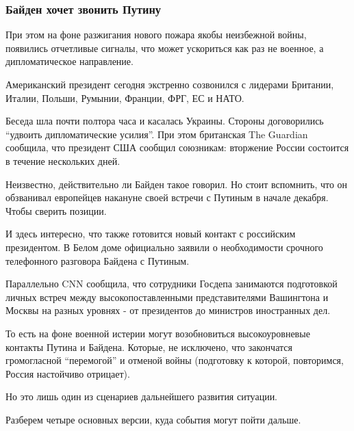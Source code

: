  
 
 
 
 

\subsubsection{Байден хочет звонить Путину}
\label{sec:12_02_2022.stz.news.ua.strana.1.vojna_nachnetsja_15_fevralja.3.baiden_hochet_zvonit_putinu}

При этом на фоне разжигания нового пожара якобы неизбежной войны, появились
отчетливые сигналы, что может ускориться как раз не военное, а дипломатическое
направление.

Американский президент сегодня экстренно созвонился с лидерами Британии,
Италии, Польши, Румынии, Франции, ФРГ, ЕС и НАТО.

Беседа шла почти полтора часа и касалась Украины. Стороны договорились \enquote{удвоить
дипломатические усилия}. При этом британская The Guardian сообщила, что
президент США сообщил союзникам: вторжение России состоится в течение
нескольких дней. 

Неизвестно, действительно ли Байден такое говорил. Но стоит вспомнить, что он
обзванивал европейцев накануне своей встречи с Путиным в начале декабря. Чтобы
сверить позиции. 

И здесь интересно, что также готовится новый контакт с российским президентом.
В Белом доме официально заявили о необходимости срочного телефонного разговора
Байдена с Путиным.

Параллельно CNN сообщила, что сотрудники Госдепа занимаются подготовкой личных
встреч между высокопоставленными представителями Вашингтона и Москвы на разных
уровнях - от президентов до министров иностранных дел.

То есть на фоне военной истерии могут возобновиться высокоуровневые контакты
Путина и Байдена. Которые, не исключено, что закончатся громогласной
\enquote{перемогой} и отменой войны (подготовку к которой, повторимся, Россия
настойчиво отрицает).

Но это лишь один из сценариев дальнейшего развития ситуации.

Разберем четыре основных версии, куда события могут пойти дальше. 

